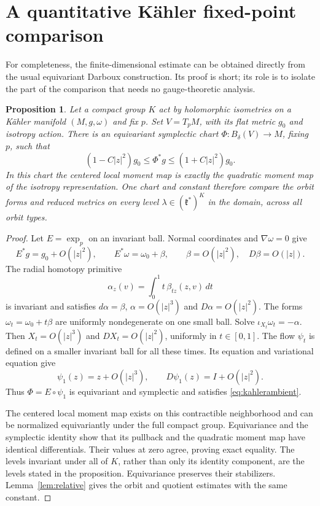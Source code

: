 \documentclass[11pt]{amsart}
\newtheorem{proposition}[theorem]{Proposition}
\theoremstyle{definition}
\theoremstyle{remark}
\newcommand{\kk}{\mathfrak k}
\begin{document}
\section{A quantitative Kähler fixed-point comparison}\label{sec:kahler}

For completeness, the finite-dimensional estimate can be obtained
directly from the usual equivariant Darboux construction. Its proof is
short; its role is to isolate the part of the comparison that needs
no gauge-theoretic analysis.

\begin{proposition}\label{prop:kahler}
Let a compact group $K$ act by holomorphic isometries on a Kähler
manifold $(M,g,\omega)$ and fix $p$. Set $V=T_pM$, with its flat
metric $g_0$ and isotropy action. There is an equivariant symplectic
chart $\Phi:B_\delta(V)\to M$, fixing $p$, such that
\begin{equation}\label{eq:kahlerambient}
 (1-C|z|^2)g_0\leq\Phi^*g\leq(1+C|z|^2)g_0.
\end{equation}
In this chart the centered local moment map is exactly the quadratic
moment map of the isotropy representation. One chart and constant
therefore compare the orbit forms and reduced metrics on every
level $\lambda\in(\kk^*)^K$ in the domain, across all orbit types.
\end{proposition}

\begin{proof}
Let $E=\exp_p$ on an invariant ball. Normal coordinates and
$\nabla\omega=0$ give
\[
 E^*g=g_0+O(|z|^2),\qquad
 E^*\omega=\omega_0+\beta,\qquad
 \beta=O(|z|^2),\quad D\beta=O(|z|).
\]
The radial homotopy primitive
\[
 \alpha_z(v)=\int_0^1t\,\beta_{tz}(z,v)\,dt
\]
is invariant and satisfies $d\alpha=\beta$,
$\alpha=O(|z|^3)$ and $D\alpha=O(|z|^2)$.
The forms $\omega_t=\omega_0+t\beta$ are uniformly nondegenerate
on one small ball. Solve
$\iota_{X_t}\omega_t=-\alpha$. Then
$X_t=O(|z|^3)$ and $DX_t=O(|z|^2)$, uniformly in $t\in[0,1]$.
The flow $\psi_t$ is defined on a smaller invariant ball for all
these times. Its equation and variational equation give
\[
 \psi_1(z)=z+O(|z|^3),\qquad D\psi_1(z)=I+O(|z|^2).
\]
Thus $\Phi=E\circ\psi_1$ is equivariant and symplectic and
satisfies \eqref{eq:kahlerambient}.

The centered local moment map exists on this contractible
neighborhood and can be normalized equivariantly under the full
compact group. Equivariance and the symplectic identity show that
its pullback and the quadratic moment map have identical
differentials. Their values at zero agree, proving exact equality.
The levels invariant under all of $K$, rather than only its identity
component, are the levels stated in the proposition. Equivariance
preserves their stabilizers. Lemma~\ref{lem:relative} gives the
orbit and quotient estimates with the same constant.
\end{proof}
\end{document}
